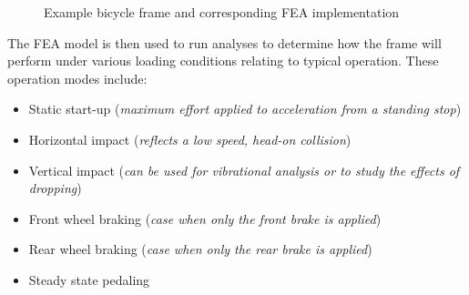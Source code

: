 \documentclass[11pt]{article}
\begin{document}
\begin{figure}[h]
	\centering
	\quad
	\quad
	\caption{Example bicycle frame and corresponding FEA implementation}
	\label{frames}
\end{figure}
The FEA model is then used to run analyses to determine how the frame will perform under various loading conditions relating to typical operation.  These operation modes include:
\begin{itemize}
	\item{Static start-up (\emph{maximum effort applied to acceleration from a standing stop})}
	\item{Horizontal impact (\emph{reflects a low speed, head-on collision})}
	\item{Vertical impact (\emph{can be used for vibrational analysis or to study the effects of dropping})}
	\item{Front wheel braking (\emph{case when only the front brake is applied})}
	\item{Rear wheel braking (\emph{case when only the rear brake is applied})}
	\item{Steady state pedaling}
\end{itemize}
\end{document}
